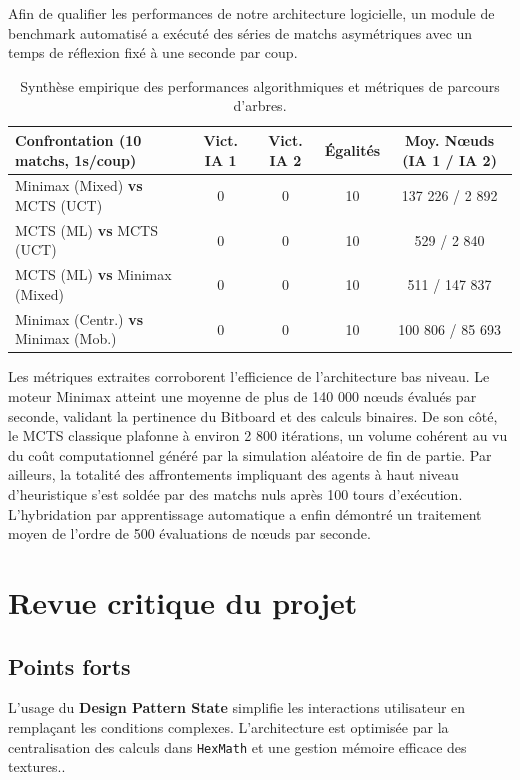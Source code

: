 \documentclass[a4paper]{article}
\begin{document}
Afin de qualifier les performances de notre architecture logicielle, un module de benchmark automatisé a exécuté des séries de matchs asymétriques avec un temps de réflexion fixé à une seconde par coup.

\begin{table}[h]
\centering
\begin{tabular}{|l|c|c|c|c|}
\hline
\textbf{Confrontation (10 matchs, 1s/coup)} & \textbf{Vict. IA 1} & \textbf{Vict. IA 2} & \textbf{Égalités} & \textbf{Moy. Nœuds (IA 1 / IA 2)} \\ \hline
Minimax (Mixed) \textbf{vs} MCTS (UCT) & 0 & 0 & 10 & 137 226 / 2 892 \\ \hline
MCTS (ML) \textbf{vs} MCTS (UCT) & 0 & 0 & 10 & 529 / 2 840 \\ \hline
MCTS (ML) \textbf{vs} Minimax (Mixed) & 0 & 0 & 10 & 511 / 147 837 \\ \hline
Minimax (Centr.) \textbf{vs} Minimax (Mob.) & 0 & 0 & 10 & 100 806 / 85 693 \\ \hline
\end{tabular}
\caption{Synthèse empirique des performances algorithmiques et métriques de parcours d'arbres.}
\label{tab:benchmark_results}
\end{table}

Les métriques extraites corroborent l'efficience de l'architecture bas niveau. Le moteur Minimax atteint une moyenne de plus de 140 000 nœuds évalués par seconde, validant la pertinence du Bitboard et des calculs binaires. De son côté, le MCTS classique plafonne à environ 2 800 itérations, un volume cohérent au vu du coût computationnel généré par la simulation aléatoire de fin de partie. Par ailleurs, la totalité des affrontements impliquant des agents à haut niveau d'heuristique s'est soldée par des matchs nuls après 100 tours d'exécution. L'hybridation par apprentissage automatique a enfin démontré un traitement moyen de l'ordre de 500 évaluations de nœuds par seconde.


\section{Revue critique du projet}

\subsection{Points forts}
L'usage du \textbf{Design Pattern State} simplifie les interactions utilisateur en remplaçant les conditions complexes. L'architecture est optimisée par la centralisation des calculs dans \texttt{HexMath} et une gestion mémoire efficace des textures..
\end{document}
